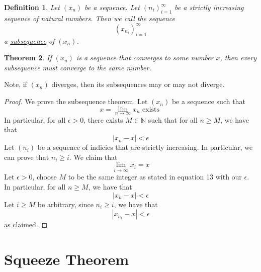 \documentclass{article}
\newtheorem{theorem}{Theorem}[section]
\newtheorem{definition}[theorem]{Definition}
\newtheorem{one minute paper}[theorem]{One Minute Paper}
\begin{document}
\begin{definition}
    Let $(x_n)$ be a sequence. Let $(n_i)_{i=1}^{\infty}$ be a strictly increasing sequence of natural numbers. Then we call the sequence
    \begin{equation}
        (x_{n_i})_{i=1}^{\infty}
    \end{equation}
    a \underline{subsequence} of $(x_n)$. 
\end{definition}

\begin{theorem}
    If $(x_n)$ is a sequence that converges to some number $x$, then every subsequence must converge to the same number. 
\end{theorem}

Note, if $(x_n)$ diverges, then its subsequences may or may not diverge. 

\begin{proof}
    We prove the subsequence theorem. Let $(x_n)$ be a sequence such that
    \begin{equation}
        x = \lim_{n\rightarrow\infty}x_n \textrm{ exists }
    \end{equation}
    In particular, for all $\epsilon > 0$, there exists $M \in \mathbb{N}$ such that for all $n \geq M$, we have that 
    \begin{equation}
        |x_n - x| < \epsilon
    \end{equation}
    Let $(n_i)$ be a sequence of indicies that are strictly increasing. In particular, we can prove that $n_i \geq i$. We claim that 
    \begin{equation}
        \lim_{i\rightarrow\infty} x_i = x
    \end{equation}
    Let $\epsilon > 0$, choose $M$ to be the same integer as stated in equation 13 with our $\epsilon$. In particular, for all $n \geq M$, we have that 
    \begin{equation}
        |x_n - x| < \epsilon
    \end{equation}  
    Let $i \geq M$ be arbitrary, since $n_i \geq i$, we have that
    \begin{equation}
        |x_{n_i} - x| < \epsilon
    \end{equation}
    as claimed. 
\end{proof}

\section*{Squeeze Theorem}
\end{document}
